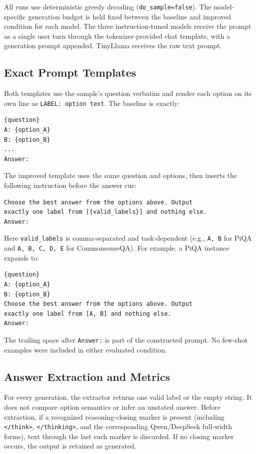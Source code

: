 \documentclass[10pt,twocolumn]{article}
\begin{document}
All runs use deterministic greedy decoding (\texttt{do\_sample=false}). The model-specific generation budget is held fixed between the baseline and improved condition for each model. The three instruction-tuned models receive the prompt as a single user turn through the tokenizer-provided chat template, with a generation prompt appended. TinyLlama receives the raw text prompt.

\subsection{Exact Prompt Templates}
Both templates use the sample's question verbatim and render each option on its own line as \texttt{LABEL: option text}. The baseline is exactly:
\begin{lstlisting}
{question}
A: {option_A}
B: {option_B}
...
Answer: 
\end{lstlisting}
The improved template uses the same question and options, then inserts the following instruction before the answer cue:
\begin{lstlisting}
Choose the best answer from the options above. Output
exactly one label from [{valid_labels}] and nothing else.
Answer: 
\end{lstlisting}
Here \texttt{{valid\_labels}} is comma-separated and task-dependent (e.g., \texttt{A, B} for PiQA and \texttt{A, B, C, D, E} for CommonsenseQA). For example, a PiQA instance expands to:
\begin{lstlisting}
{question}
A: {option_A}
B: {option_B}
Choose the best answer from the options above. Output
exactly one label from [A, B] and nothing else.
Answer: 
\end{lstlisting}
The trailing space after \texttt{Answer:} is part of the constructed prompt. No few-shot examples were included in either evaluated condition.

\subsection{Answer Extraction and Metrics}
For every generation, the extractor returns one valid label or the empty string. It does not compare option semantics or infer an unstated answer. Before extraction, if a recognized reasoning-closing marker is present (including \texttt{</think>}, \texttt{</thinking>}, and the corresponding Qwen/DeepSeek full-width forms), text through the last such marker is discarded. If no closing marker occurs, the output is retained as generated.
\end{document}
